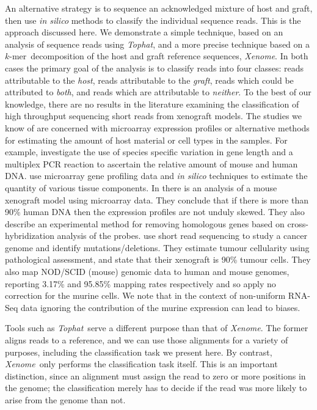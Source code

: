 \documentclass{bioinfo}
\newcommand{\Xenome}{\textit{Xenome}{}}
\newcommand{\Tophat}{\textit{Tophat}{}}
\newcommand{\kmer}{$k$-mer{}}
\begin{document}
An alternative strategy is to sequence an acknowledged mixture of
host and graft, then use \textit{in silico} methods to classify
the individual sequence reads.  This is the approach discussed here.
We demonstrate a simple technique, based on an analysis of sequence reads
using \Tophat, and a more precise technique based on a \kmer\ 
decomposition of the host and graft reference sequences, \Xenome.
In both cases the primary goal of the analysis is to classify reads
into four classes: reads attributable to the \textit{host}, reads
attributable to the \textit{graft}, reads which could be attributed to
\textit{both}, and reads which are attributable to \textit{neither}.
To the best of our knowledge, there are no results in the literature examining
the classification of high throughput sequencing short reads from xenograft models.
The studies we know of are concerned with microarray expression profiles
or alternative methods for estimating the amount of host material or cell types in 
the samples. For example, \cite{Lin:2010p23155} investigate the use of species specific variation in gene length
and a multiplex PCR reaction to ascertain the relative amount of mouse and human DNA.
\cite{Wang:2010p29069} use microarray gene profiling data and \textit{in silico} techniques to estimate the 
quantity of various tissue components.
In \cite{Samuels:2010p29569} there is an analysis of a mouse xenograft model using microarray data.
They conclude that if there is more than 90\% human DNA then the expression profiles are not
unduly skewed. They also describe an experimental method for removing homologous genes based on 
cross-hybridization analysis of the probes. 
\cite{ding2010genome} use short read
sequencing to study a cancer genome and identify mutations/deletions.
They estimate tumour cellularity using pathological assessment, and
state that their xenograft is 90\% tumour cells. They also map NOD/SCID (mouse) genomic data
to human and mouse genomes, reporting 3.17\% and 95.85\% mapping rates
respectively and so apply no correction for the murine cells. 
We note that in the context of non-uniform RNA-Seq data ignoring the contribution
of the murine expression can lead to biases.

Tools such as \Tophat\ serve a different purpose than that of
\Xenome.  The former aligns reads to a reference, and we can use
those alignments for a variety of purposes, including the classification
task we present here. By contrast, \Xenome\ only performs the classification
task itself.
This is an important distinction, since an alignment must assign the
read to zero or more positions in the genome; the classification merely
has to decide if the read was more likely to arise from the genome than not.
\end{document}
